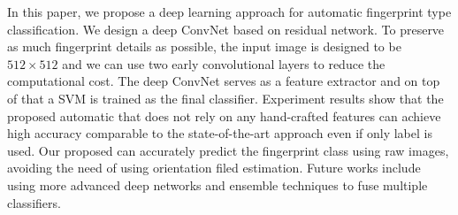 
In this paper, we propose a deep learning approach for automatic fingerprint type classification. We design a deep ConvNet based on residual network. To preserve as much fingerprint details as possible, the input image is designed to be  $512\times512$ and we can use two early convolutional layers to reduce the computational cost. The deep ConvNet serves as a feature extractor and on top of that a SVM is trained as the final classifier. Experiment results show that the proposed automatic that does not rely on any hand-crafted features can achieve high accuracy comparable to the state-of-the-art approach even if only label is used. Our proposed can accurately predict the fingerprint class using raw images, avoiding the need of using orientation filed estimation. Future works include using more advanced deep networks and ensemble techniques to fuse multiple classifiers.